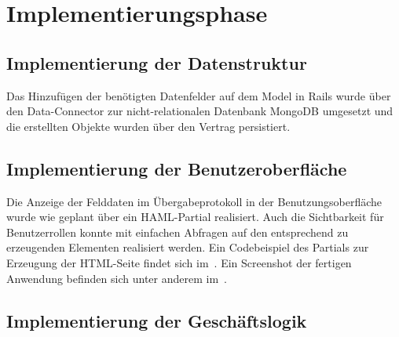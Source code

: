 \section{Implementierungsphase} 
\label{sec:Implementierungsphase}

\subsection{Implementierung der Datenstruktur}
\label{subsec:ImplementierungDatenstruktur}

Das Hinzufügen der benötigten Datenfelder auf dem Model in Rails wurde über den Data-Connector zur nicht-relationalen Datenbank MongoDB umgesetzt und die erstellten Objekte wurden über den Vertrag persistiert.

\subsection{Implementierung der Benutzeroberfläche}
\label{subsec:ImplementierungBenutzeroberfläche}

Die Anzeige der Felddaten im Übergabeprotokoll in der Benutzungsoberfläche wurde wie geplant über ein \ac{HAML}-Partial realisiert. Auch die Sichtbarkeit für Benutzerrollen konnte mit einfachen Abfragen auf den entsprechend zu erzeugenden Elementen realisiert werden. Ein Codebeispiel des Partials zur Erzeugung der \ac{HTML}-Seite findet sich im~. Ein Screenshot der fertigen Anwendung befinden sich unter anderem im~.

\subsection{Implementierung der Geschäftslogik}
\label{subsec:ImplementierungGeschäftslogik}

